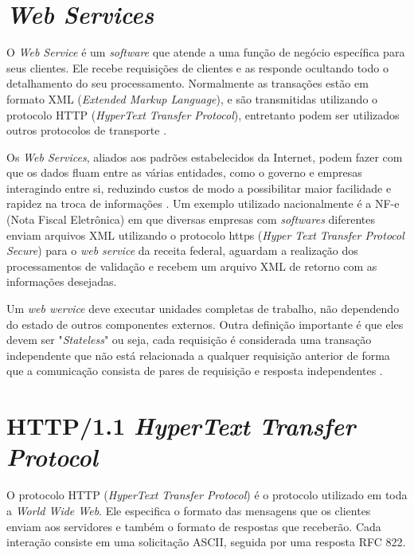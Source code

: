 \section{\textit{Web Services}}\label{sec:WebServices}


O \textit{Web Service} é um \textit{software}  que atende a uma função de negócio específica para seus clientes. Ele recebe requisições de clientes e as responde ocultando todo o detalhamento do seu processamento. Normalmente as transações estão em formato XML (\textit{Extended Markup Language}), e são transmitidas utilizando o protocolo HTTP (\textit{HyperText Transfer Protocol}), entretanto podem ser utilizados outros protocolos de transporte \cite{Sampaio:2003}.

Os \textit{Web Services}, aliados aos padrões estabelecidos da Internet, podem fazer com que os dados fluam entre as várias entidades, como o governo e empresas interagindo entre si, reduzindo custos de modo a possibilitar maior facilidade e rapidez na troca de informações \cite{Abinader:2006}. Um exemplo utilizado nacionalmente é a NF-e (Nota Fiscal Eletrônica) em que diversas empresas com \textit{softwares} diferentes enviam arquivos XML utilizando o protocolo https (\textit{Hyper Text Transfer Protocol Secure}) para o \textit{web service} da receita federal, aguardam a realização dos processamentos de validação e recebem um arquivo XML de retorno com as informações desejadas.

Um \textit{web wervice} deve executar unidades completas de trabalho, não dependendo do estado de outros componentes externos. Outra definição importante é que eles devem ser "\textit{Stateless}" ou seja, cada requisição é considerada uma transação independente que não está relacionada a qualquer requisição anterior de forma que a comunicação consista de pares de requisição e resposta independentes \cite{Sampaio:2003, W3C:2001}.


\section{HTTP/1.1 \textit{HyperText Transfer Protocol}} \label{sec:Http}

O protocolo HTTP (\textit{HyperText Transfer Protocol}) é o protocolo utilizado em toda a \textit{World Wide Web}. Ele especifica o formato das mensagens que os clientes enviam aos servidores e também o formato de respostas que receberão. Cada interação consiste em uma solicitação ASCII, seguida por uma resposta RFC 822. 

